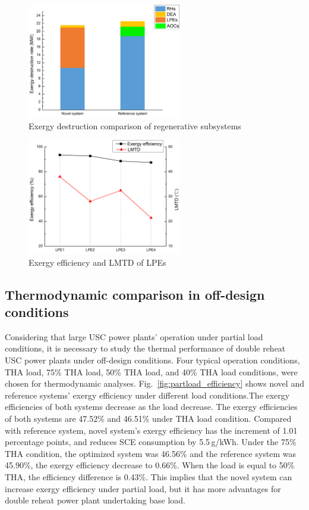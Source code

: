 \documentclass[preprint,12pt]{elsarticle}
\begin{document}
\begin{figure}[htbp]
\centering
\includegraphics[width=0.6\textwidth]{fig/regenerative_subsys_compare.png}
\caption{Exergy destruction comparison of regenerative subsystems} 
\label{fig:regenerative_subsys_compare}
\end{figure}



\begin{figure}[htbp]
\centering
\includegraphics[width=0.6\textwidth]{fig/LPE_exergy_LMTD.png}
\caption{Exergy efficiency and LMTD of LPEs} 
\label{fig:LPE_exergy_LMDT}
\end{figure}


\subsection{Thermodynamic comparison in off-design conditions}
\label{ssub:offdesing_compare}
Considering that large USC power plants' operation under partial load conditions, it is necessary to study the thermal performance of double reheat USC power plants under off-design conditions.
Four typical operation conditions, THA load, 75\% THA load, 50\% THA load, and 40\% THA load conditions, were chosen for thermodynamic analyses. 
Fig.~\ref{fig:partload_efficiency} shows novel and reference systems' exergy efficiency under different load conditions.The exergy efficiencies of both systems decrease as the load decrease.
The exergy efficiencies of both systems are 47.52\% and 46.51\% under THA load condition. Compared with reference system, novel system's exergy efficiency has the increment of 1.01 percentage points, and reduces SCE consumption by 5.5\,g/kWh.
Under the 75\% THA condition, the optimized system was 46.56\% and the reference system was 45.90\%, the exergy
efficiency decrease to 0.66\%. 
When the load is equal to 50\% THA, the efficiency difference is 0.43\%.
This implies that the novel system can increase exergy efficiency under partial load, but it has more advantages for double reheat power plant undertaking base load.
\end{document}
